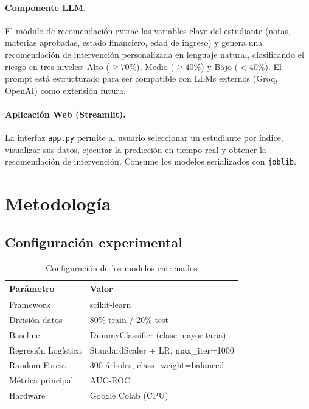 \documentclass[10pt,twocolumn]{article}
\begin{document}
\paragraph{Componente LLM.}
El módulo de recomendación extrae las variables clave del estudiante
(notas, materias aprobadas, estado financiero, edad de ingreso) y genera
una recomendación de intervención personalizada en lenguaje natural,
clasificando el riesgo en tres niveles: Alto ($\geq 70\%$), Medio
($\geq 40\%$) y Bajo ($< 40\%$). El prompt está estructurado para ser
compatible con LLMs externos (Groq, OpenAI) como extensión futura.

\paragraph{Aplicación Web (Streamlit).}
La interfaz \texttt{app.py} permite al usuario seleccionar un estudiante
por índice, visualizar sus datos, ejecutar la predicción en tiempo real
y obtener la recomendación de intervención. Consume los modelos
serializados con \texttt{joblib}.

\section{Metodología}

\subsection{Configuración experimental}

\begin{table}[H]
\centering
\caption{Configuración de los modelos entrenados}
\label{tab:hparams}
\begin{tabularx}{\columnwidth}{lX}
\toprule
\textbf{Parámetro} & \textbf{Valor} \\
\midrule
Framework & scikit-learn \\
División datos & 80\% train / 20\% test \\
Baseline & DummyClassifier (clase mayoritaria) \\
Regresión Logística & StandardScaler + LR, max\_iter=1000 \\
Random Forest & 300 árboles, class\_weight=balanced \\
Métrica principal & AUC-ROC \\
Hardware & Google Colab (CPU) \\
\bottomrule
\end{tabularx}
\end{table}
\end{document}
